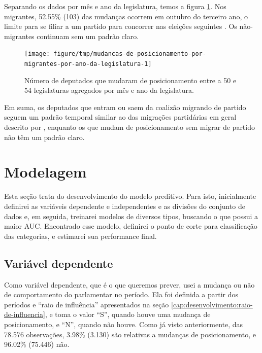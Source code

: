 \documentclass[a4paper,titlepage]{ppgi}\usepackage[]{graphicx}\usepackage[]{color}
\newenvironment{knitrout}{}{} %
\begin{document}
Separando os dados por mês e ano da legislatura, temos a figura
\ref{fig:mudancas-de-posicionamento-por-migrantes-por-ano-da-legislatura}. Nos
migrantes,
52.55\%
(103) das mudanças ocorrem
em outubro do terceiro ano, o limite para se filiar a um partido para concorrer
nas eleições seguintes \cite{Lei9504/1997}. Os não-migrantes continuam sem um
padrão claro.

\begin{knitrout}
\color{fgcolor}\begin{figure}
\texttt{[image: figure/tmp/mudancas-de-posicionamento-por-migrantes-por-ano-da-legislatura-1]} \caption[Número de deputados que mudaram de posicionamento entre a 50\textordfeminine{} e 54\textordfeminine{} legislaturas agregados por mês e ano da legislatura]{Número de deputados que mudaram de posicionamento entre a 50\textordfeminine{} e 54\textordfeminine{} legislaturas agregados por mês e ano da legislatura.}\label{fig:mudancas-de-posicionamento-por-migrantes-por-ano-da-legislatura}
\end{figure}


\end{knitrout}

Em suma, os deputados que entram ou saem da coalizão migrando de partido
seguem um padrão temporal similar ao das migrações partidárias em geral
descrito por , enquanto os que mudam de posicionamento
sem migrar de partido não têm um padrão claro.

\section{Modelagem}
\label{cap:desenvolvimento:modelagem}



Esta seção trata do desenvolvimento do modelo preditivo. Para isto,
inicialmente definirei as variáveis dependente e independentes e as divisões do
conjunto de dados e, em seguida, treinarei modelos de diversos tipos, buscando
o que possui a maior \gls{AUC}. Encontrado esse modelo,
definirei o ponto de corte para classificação das categorias, e estimarei sua
performance final.

\subsection{Variável dependente}

Como variável dependente, que é o que queremos prever, usei a mudança ou não de
comportamento do parlamentar no período. Ela foi definida a partir dos períodos
e ``raio de influência'' apresentados na seção
\ref{cap:desenvolvimento:raio-de-influencia}, e toma o valor ``S'', quando
houve uma mudança de posicionamento, e ``N'', quando não houve. Como já visto
anteriormente, das 78.576 observações,
3.98\%
(3.130) são relativas a mudanças
de posicionamento, e 96.02\%
(75.446) não.
\end{document}
